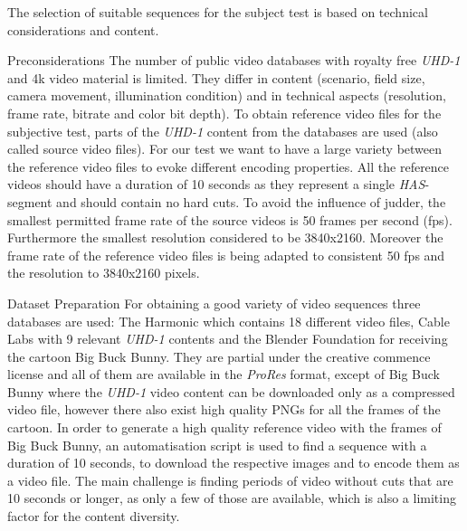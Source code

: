 The selection of suitable sequences for the subject test is based on technical considerations and content.

\large{Preconsiderations}
The number of public video databases with royalty free \textit{UHD-1} and 4k video material is limited. They differ in content (scenario, field size, camera movement, illumination condition) and in technical aspects (resolution, frame rate, bitrate and color bit depth).
To obtain reference video files for the subjective test, parts of the \textit{UHD-1} content from the databases are used (also called source video files).
For our test we want to have a large variety between the reference video files to evoke different encoding properties.
All the reference videos should have a duration of 10 seconds as they represent a single \textit{HAS}-segment and should contain no hard cuts.
To avoid the influence of judder, the smallest permitted frame rate of the source videos is 50 frames per second (fps). Furthermore the smallest resolution considered to be 3840x2160. Moreover the frame rate of the reference video files is being adapted to consistent 50 fps and the resolution to 3840x2160 pixels.

\large{Dataset Preparation}
For obtaining a good variety of video sequences three databases are used: The Harmonic \cite{web:harmonic} which contains 18 different video files, Cable Labs \cite{web:cablelabs} with 9 relevant \textit{UHD-1} contents and the Blender Foundation \cite{web:bbb} for receiving the cartoon Big Buck Bunny. They  are partial under the creative commence license and all of them are available in the \textit{ProRes} format, except of Big Buck Bunny where the \textit{UHD-1} video content can be downloaded only as a compressed video file, however there also exist high quality PNGs for all the frames of the cartoon. In order to generate a high quality reference video with the frames of Big Buck Bunny, an automatisation script is used to find a sequence with a duration of 10 seconds, to download the respective images and to encode them as a video file.
The main challenge is finding periods of video without cuts that are 10 seconds or longer, as only a few of those are available, which is also a limiting factor for the content diversity.

